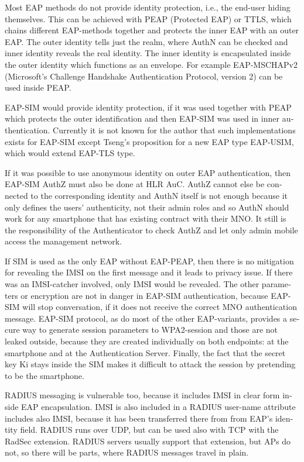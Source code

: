 \documentclass[12pt,a4paper,english]{tutthesis}
\begin{document}
\begin{otherlanguage}{english}
Most EAP methods do not provide identity protection, i.e., the
end-user hiding themselves.
This can be achieved with PEAP (Protected EAP) or TTLS, which
chains different EAP-methods together and protects the inner EAP with
an outer EAP. 
The outer identity tells just the realm, where AuthN can be checked
and inner identity reveals the real identity.  The inner identity is
encapsulated inside the outer identity which functions as an
envelope. 
For example EAP-MSCHAPv2 (Microsoft's Challenge
Handshake Authentication Protocol, version 2) can be used inside PEAP.


EAP-SIM would provide identity protection, if it was used together
with PEAP which protects the outer identification  and
then EAP-SIM was used in inner authentication.
Currently it is not known for the author that such implementations exists for
EAP-SIM  except Tseng's proposition\cite{tseng-usim} for a new EAP type
EAP-USIM, which would extend EAP-TLS type.

If it was possible to use anonymous identity on outer EAP
authentication, then EAP-SIM AuthZ must also be done at HLR AuC.
AuthZ cannot else be connected to the corresponding
identity and AuthN itself is not enough because it only defines the users'
authenticity, not their admin roles and so 
AuthN should work for any  smartphone that has existing contract with
their MNO. 
It still is the responsibility of the Authenticator to 
check AuthZ  and let only admin mobile access the management network.

If SIM is used as the only EAP without EAP-PEAP, then there is no
mitigation for revealing the IMSI on the first message and it leads to
privacy issue.  If there was an IMSI-catcher involved, only IMSI would
be revealed.  The other parameters or encryption are not in danger in
EAP-SIM authentication, because EAP-SIM will stop conversation, if it
does not receive the correct MNO authentication message.  EAP-SIM
protocol, as do most of the other EAP-variants, provides a secure way
to generate session parameters to WPA2-session and those are not
leaked outside, because they are created individually on both
endpoints: at the smartphone and at the Authentication Server.
Finally, the fact that the secret key Ki stays inside the SIM makes it
difficult to attack the session by pretending to be the smartphone.






RADIUS messaging is vulnerable too, because it includes IMSI in clear form 
inside EAP encapsulation. IMSI is also included in a RADIUS user-name
attribute includes also IMSI, because it has been transferred there from
from EAP's identity field.
RADIUS runs over UDP, but can be used also with TCP with the RadSec
extension. RADIUS servers usually support that extension, but APs do not, so 
there will be parts, where RADIUS messages travel in plain.





\end{otherlanguage}
\end{document}
